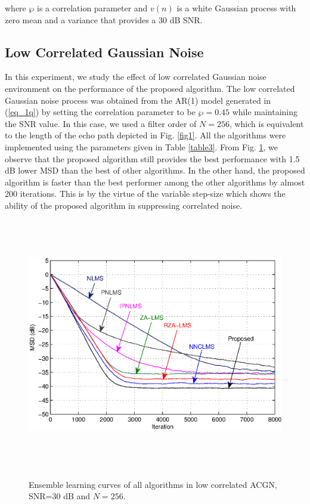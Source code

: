 \noindent where $\wp$ is a correlation parameter and $v(n)$ is a white Gaussian process with zero mean and a variance that provides a 30 dB SNR.
\vspace{-0.3cm}
\subsection{Low Correlated Gaussian Noise}\label{sec:5.2.2.1}
\vspace{-0.5cm}
\noindent In this experiment, we study the effect of low correlated Gaussian noise environment on the performance of the proposed algorithm. The low correlated Gaussian noise process was obtained from the AR(1) model generated in (\ref{eq_1q}) by setting the correlation parameter to be $\wp=0.45$ while maintaining the SNR value. In this case, we used a filter order of $N=256$, which is equivalent to the length of the echo path depicted in Fig. \ref{fig1}. All the algorithms were implemented using the parameters given in Table \ref{table3}. From Fig. \ref{fig5}, we observe that the proposed algorithm still provides the best performance with 1.5 dB lower MSD than the best of other algorithms. In the other hand, the proposed algorithm is faster than the best performer among the other algorithms by almost 200 iterations. This is by the virtue of the variable step-size which shows the ability of the proposed algorithm in suppressing correlated noise.

\begin{figure}[!htb]
\begin{center}
\vspace{1cm}
\includegraphics[width=14.25cm, height=11cm]{Figures/Chapter5/fig5.eps}\\
\end{center}
\vspace{-1cm}
\caption{Ensemble learning curves of all algorithms in low correlated ACGN, SNR=30 dB and $N=256$.}
\label{fig5}
\vspace{1.5cm}
\end{figure}

